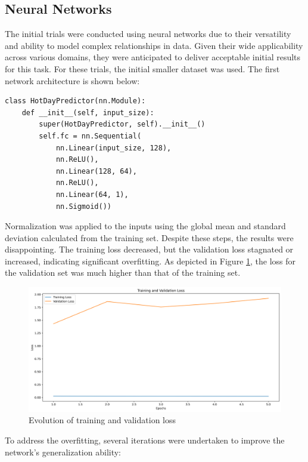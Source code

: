 \documentclass[conference,9pt]{IEEEtran}
\begin{document}
\subsection{Neural Networks}
The initial trials were conducted using neural networks due to their versatility and ability to model complex relationships in data. Given their wide applicability across various domains, they were anticipated to deliver acceptable initial results for this task. For these trials, the initial smaller dataset was used. The first network architecture is shown below:
\begin{lstlisting}
class HotDayPredictor(nn.Module):
    def __init__(self, input_size):
        super(HotDayPredictor, self).__init__()
        self.fc = nn.Sequential(
            nn.Linear(input_size, 128),
            nn.ReLU(),
            nn.Linear(128, 64),
            nn.ReLU(),
            nn.Linear(64, 1),
            nn.Sigmoid())
\end{lstlisting}
Normalization was applied to the inputs using the global mean and standard deviation calculated from the training set. Despite these steps, the results were disappointing. The training loss decreased, but the validation loss stagnated or increased, indicating significant overfitting. As depicted in Figure \ref{fig:baseline}, the loss for the validation set was much higher than that of the training set.
\begin{figure}[h]
    \centering
    \includegraphics[width=\columnwidth]{../training_validation_loss_baseline.png}
    \caption{Evolution of training and validation loss}
    \label{fig:baseline}
\end{figure}
To address the overfitting, several iterations were undertaken to improve the network's generalization ability:
\end{document}
